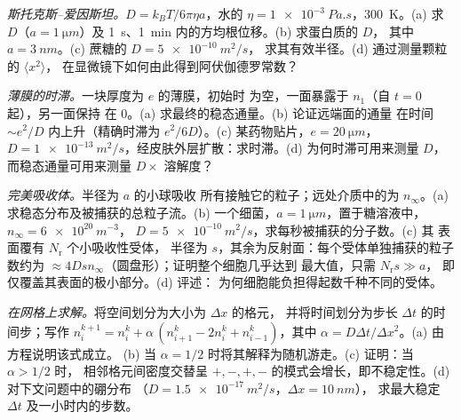 \begin{exercise}[$\star\star$]\label{exo:b2:particle-diffusion:9}
\emph{斯托克斯–爱因斯坦。}$D = k_BT/6\pi\eta a$，水的 $\eta =
\qty{1e-3}{Pa.s}$，\qty{300}{K}。(a) 求 $D$（$a = \qty{1}{\micro m}$）及
\qty{1}{s}、\qty{1}{min} 内的方均根位移。(b) 求蛋白质的 $D$，
其中 $a = \qty{3}{nm}$。(c) 蔗糖的 $D = \qty{5e-10}{m^2/s}$，
求其有效半径。(d) 通过测量颗粒的 $\langle x^2\rangle$，
在显微镜下如何由此得到阿伏伽德罗常数？
\end{exercise}

\begin{exercise}[$\star\star\star$]\label{exo:b2:particle-diffusion:10}
\emph{薄膜的时滞。}一块厚度为 $e$ 的薄膜，初始时
为空，一面暴露于 $n_1$（自 $t = 0$ 起），另一面保持
在 $0$。(a) 求最终的稳态通量。(b) 论证远端面的通量
在时间 $\sim e^2/D$ 内上升（精确时滞为
$e^2/6D$）。(c) 某药物贴片，$e = \qty{20}{\micro m}$，$D =
\qty{1e-13}{m^2/s}$，经皮肤外层扩散：求时滞。(d) 为何时滞可用来测量 $D$，
而稳态通量可用来测量
$D \times$ 溶解度？
\end{exercise}

\begin{exercise}[$\star\star\star$]\label{exo:b2:particle-diffusion:11}
\emph{完美吸收体。}半径为 $a$ 的小球吸收
所有接触它的粒子；远处介质中的为 $n_\infty$。(a)
求稳态分布及被捕获的总粒子流。(b) 一个细菌，$a =
\qty{1}{\micro m}$，置于糖溶液中，$n_\infty = \qty{6e20}{m^{-3}}$，
$D = \qty{5e-10}{m^2/s}$，求每秒被捕获的分子数。(c) 其
表面覆有 $N_{\text{r}}$ 个小吸收性受体，
半径为 $s$，其余为反射面：每个受体单独捕获的粒子数约为 $\approx
4Ds n_\infty$（圆盘形）；证明整个细胞几乎达到
最大值，只需 $N_{\text{r}} s \gg a$，
即仅覆盖其表面的极小部分。(d) 评述：
为何细胞能负担得起数千种不同的受体。
\end{exercise}

\begin{exercise}[$\star\star\star$]\label{exo:b2:particle-diffusion:12}
\emph{在网格上求解。}将空间划分为大小为 $\Delta x$ 的格元，
并将时间划分为步长 $\Delta t$ 的时间步；写作 $n_i^{k+1} = n_i^k + \alpha\,(n_{i+1}^k
- 2n_i^k + n_{i-1}^k)$，其中 $\alpha = D\Delta t/\Delta x^2$。(a) 由方程说明该式成立。
(b) 当 $\alpha =
1/2$ 时将其解释为随机游走。(c) 证明：当 $\alpha > 1/2$ 时，
相邻格元间密度交替呈 $+,-,+,-$ 的模式会增长，即不稳定性。(d) 对下文问题中的硼分布
（$D = \qty{1.5e-17}{m^2/s}$，$\Delta x = \qty{10}{nm}$），
求最大稳定 $\Delta t$ 及一小时内的步数。
\end{exercise}

